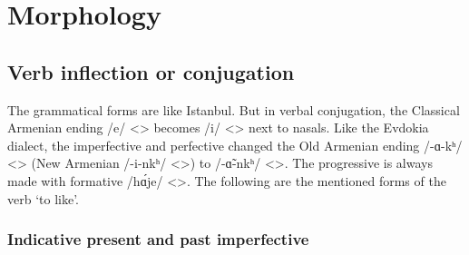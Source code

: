 \section{Morphology}
\subsection{Verb inflection or conjugation}
The grammatical forms are like Istanbul. But in verbal conjugation, the Classical Armenian ending /e/ <> becomes /i/ <> next to nasals. Like the Evdokia dialect, the imperfective and perfective changed the Old Armenian ending /-ɑ-kʰ/ <> (New Armenian /-i-nkʰ/ <>) to /-ɑ̃-nkʰ/ <>. The progressive is always made with formative /h\'ɑje/ <>. The following are the mentioned forms of the verb `to like'. 

{\paradigmExplanation}

\subsubsection{Indicative present and past imperfective}





